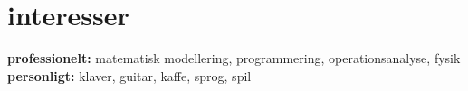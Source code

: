 \documentclass[]{friggeri-cv} %
\begin{document}

\section{interesser}
\textbf{professionelt:} matematisk modellering, programmering,  operationsanalyse,  fysik
\textbf{personligt:} klaver, guitar, kaffe, sprog, spil

%
%
%
%
%
%

\end{document}
